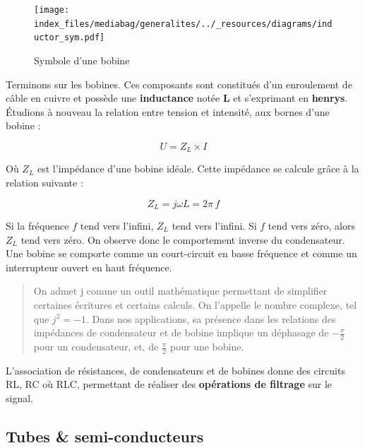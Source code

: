 \documentclass[
  letterpaper,
  DIV=11,
  numbers=noendperiod]{scrreprt}
\begin{document}
\begin{figure}

{\centering \texttt{[image: index\_files/mediabag/generalites/../\_resources/diagrams/inductor\_sym.pdf]}

}

\caption{Symbole d'une bobine}

\end{figure}

Terminons sur les bobines. Ces composants sont constitués d'un
enroulement de câble en cuivre et possède une \textbf{inductance} notée
\textbf{L} et s'exprimant en \textbf{henrys}. Étudions à nouveau la
relation entre tension et intensité, aux bornes d'une bobine :

\[ U = Z_L \times I \]

Où \(Z_L\) est l'impédance d'une bobine idéale. Cette impédance se
calcule grâce à la relation suivante :

\[ Z_L = j\omega L = 2 \pi \, f \]

Si la fréquence \(f\) tend vers l'infini, \(Z_L\) tend vers l'infini. Si
\(f\) tend vers zéro, alors \(Z_L\) tend vers zéro. On observe donc le
comportement inverse du condensateur. Une bobine se comporte comme un
court-circuit en basse fréquence et comme un interrupteur ouvert en haut
fréquence.

\begin{quote}
On admet j comme un outil mathématique permettant de simplifier
certaines écritures et certains calculs. On l'appelle le nombre
complexe, tel que \(j^2 = -1\). Dans nos applications, sa présence dans
les relations des impédances de condensateur et de bobine implique un
déphasage de \(-\frac{\pi}{2}\) pour un condensateur, et, de
\(\frac{\pi}{2}\) pour une bobine.
\end{quote}

L'association de résistances, de condensateurs et de bobines donne des
circuits RL, RC où RLC, permettant de réaliser des \textbf{opérations de
filtrage} sur le signal.

\hypertarget{tubes-semi-conducteurs}{%
\subsection{Tubes \& semi-conducteurs}\label{tubes-semi-conducteurs}}
\end{document}

